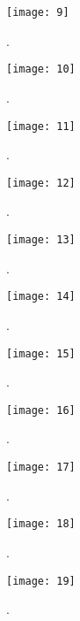 \begin{figure}[H]
\centering
\texttt{[image: 9]}
\caption{.}
\end{figure}

\begin{figure}[H]
\centering
\texttt{[image: 10]}
\caption{.}
\end{figure}

\begin{figure}[H]
\centering
\texttt{[image: 11]}
\caption{.}
\end{figure}

\begin{figure}[H]
\centering
\texttt{[image: 12]}
\caption{.}
\end{figure}

\begin{figure}[H]
\centering
\texttt{[image: 13]}
\caption{.}
\end{figure}

\begin{figure}[H]
\centering
\texttt{[image: 14]}
\caption{.}
\end{figure}

\begin{figure}[H]
\centering
\texttt{[image: 15]}
\caption{.}
\end{figure}

\begin{figure}[H]
\centering
\texttt{[image: 16]}
\caption{.}
\end{figure}

\begin{figure}[H]
\centering
\texttt{[image: 17]}
\caption{.}
\end{figure}

\begin{figure}[H]
\centering
\texttt{[image: 18]}
\caption{.}
\end{figure}

\begin{figure}[H]
\centering
\texttt{[image: 19]}
\caption{.}
\end{figure}

